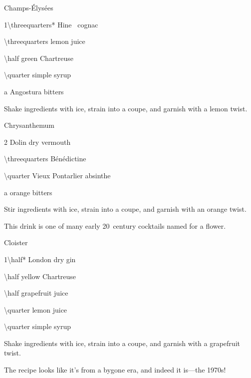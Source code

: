 \begin{PDTCocktail}{Champs-\'Elys\'ees}
	\begin{Ingredients}
	\item \SI{1\threequarters*}{\oz} Hine \vsop\ cognac
	\item \SI{\threequarters}{\oz} lemon juice
	\item \SI{\half}{\oz} green Chartreuse
	\item \SI{\quarter}{\oz} simple syrup
	\item a \si{\dash} Angostura bitters
	\end{Ingredients}
	
	\begin{Instructions}
	Shake ingredients with ice, strain into a coupe, and garnish with a lemon twist.
	\end{Instructions}
\end{PDTCocktail}

\begin{PDTCocktail}{Chrysanthemum}
	\begin{Ingredients}
	\item \SI{2}{\oz} Dolin dry vermouth
	\item \SI{\threequarters}{\oz} B\'en\'edictine
	\item \SI{\quarter}{\oz} Vieux Pontarlier absinthe
	\item a \si{\dash} orange bitters
	\end{Ingredients}
	
	\begin{Instructions}
	Stir ingredients with ice, strain into a coupe, and garnish with an orange twist.
	
	This drink is one of many early 20~century cocktails named for a flower.
	\end{Instructions}
\end{PDTCocktail}

\begin{PDTCocktail}{Cloister}
	\begin{Ingredients}
	\item \SI{1\half*}{\oz} London dry gin
	\item \SI{\half}{\oz} yellow Chartreuse
	\item \SI{\half}{\oz} grapefruit juice
	\item \SI{\quarter}{\oz} lemon juice
	\item \SI{\quarter}{\oz} simple syrup
	\end{Ingredients}
	
	\begin{Instructions}
	Shake ingredients with ice, strain into a coupe, and garnish with a grapefruit twist.
	
	The recipe looks like it's from a bygone era, and indeed it is---the 1970s!
	\end{Instructions}
\end{PDTCocktail}

